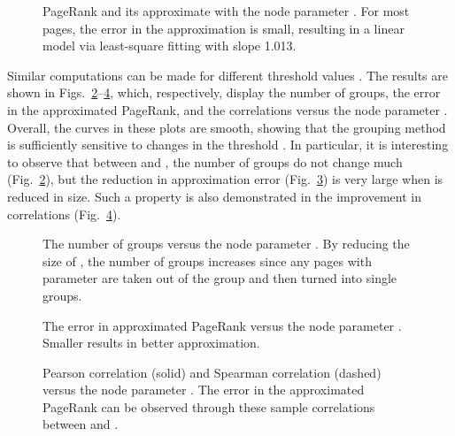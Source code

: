 \documentclass[11pt,draftcls,onecolumn]{IEEEtran}
\newcommand{\fig}[3]{\resizebox{#1}{#2}{\texttt{[image: \#3]}}}
\begin{document}
\begin{table}[t]
\begin{figure}[t]
  \centering
  \fig{9cm}{!}{PR_orig_approx.eps}
  \caption{PageRank  and its approximate  with the node parameter .
      For most pages, the error in the approximation is small, resulting in a linear model
      via least-square fitting with slope 1.013.}
  \label{fig:PR_orig_approx}
\end{figure}

Similar computations can be made for different threshold values . The results
are shown in Figs.~\ref{fig:num_grp_delta}--\ref{fig:correlation_delta},
which, respectively, display the number of groups, the error in the approximated 
PageRank, and the correlations versus the node parameter .
Overall, the curves in these plots are smooth, showing that the grouping
method is sufficiently sensitive to changes in the threshold .
In particular, it is interesting to observe that between  and , the
number of groups do not change much (Fig.~\ref{fig:num_grp_delta}),
but the reduction in approximation error (Fig.~\ref{fig:error_delta})
is very large when  is reduced in size. Such a property is also demonstrated 
in the improvement in correlations (Fig.~\ref{fig:correlation_delta}).


\begin{figure}[t]
  \centering
  \fig{9cm}{!}{num_grp_delta.eps}
  \caption{The number of groups versus the node parameter . By reducing the size of ,
  the number of groups increases since any pages with parameter  are taken out of 
   the group and then turned into single groups.}
  \label{fig:num_grp_delta}
\end{figure}

\begin{figure}[t]
  \centering
  \fig{9cm}{!}{error_delta.eps}
  \caption{The error  in approximated PageRank versus the node parameter .
           Smaller  results in better approximation.}
  \label{fig:error_delta}
\end{figure}

\begin{figure}[t]
  \centering
  \fig{9cm}{!}{correlation_delta.eps}
  \caption{Pearson correlation (solid) and Spearman correlation (dashed) versus the
           node parameter . The error in the approximated PageRank  can 
            be observed through these sample correlations between  and .}
  \label{fig:correlation_delta}
\end{figure}



\end{table}
\end{document}

